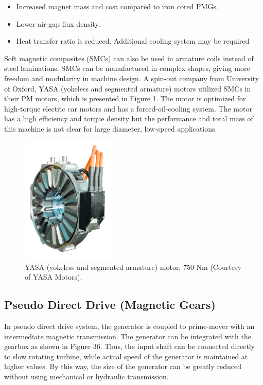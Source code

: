 \documentclass[a4paper, 11pt]{article} %
\begin{document}
\begin{itemize}
	\item Increased magnet mass and cost compared to iron cored PMGs.
	\item Lower air-gap flux density.
	\item Heat transfer ratio is reduced. Additional cooling system may be required
\end{itemize}

Soft magnetic composites (SMCs) can also be used in armature coils instead of steel laminations. SMCs can be manufactured in complex shapes, giving more freedom and modularity in machine design. A spin-out company from University of Oxford, YASA (yokeless and segmented armature) motors utilized SMCs in their PM motors, which is presented in Figure \ref{yasa_motor}. The motor is optimized for high-torque electric car motors and has a forced-oil-cooling system. The motor has a high efficiency and torque density but the performance and total mass of this machine is not clear for large diameter, low-speed applications.


  \begin{figure}[t]
    \centering
    \includegraphics[width=0.4\textwidth]{yasa_motor}
    \caption{YASA (yokeless and segmented armature) motor, 750 Nm (Courtesy of YASA Motors).} 
    \label{yasa_motor}
  \end{figure}

\subsection{Pseudo Direct Drive (Magnetic Gears)}

In pseudo direct drive system, the generator is coupled to prime-mover with an intermediate magnetic transmission. The generator can be integrated with the gearbox as shown in Figure 36. Thus, the input shaft can be connected directly to slow rotating turbine, while actual speed of the generator is maintained at higher values. By this way, the size of the generator can be greatly reduced without using mechanical or hydraulic transmission.
\end{document}
